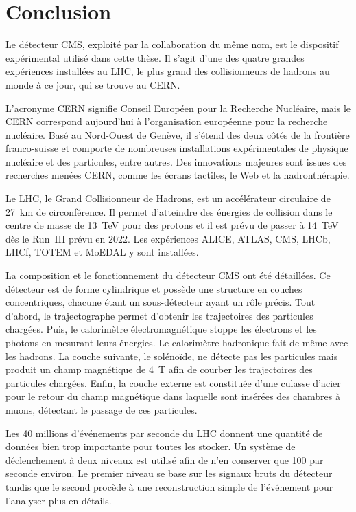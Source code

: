 \section{Conclusion}\label{chapter-LHC-section-conclusion}
Le détecteur CMS, exploité par la collaboration du même nom, est le dispositif expérimental utilisé dans cette thèse.
Il s'agit d'une des quatre grandes expériences installées au LHC, le plus grand des collisionneurs de hadrons au monde à ce jour, qui se trouve au CERN.
\par L'acronyme \og CERN \fg{} signifie Conseil Européen pour la Recherche Nucléaire, mais le CERN correspond aujourd'hui à l'organisation européenne pour la recherche nucléaire.
Basé au Nord-Ouest de Genève, il s'étend des deux côtés de la frontière franco-suisse et comporte de nombreuses installations expérimentales de physique nucléaire et des particules, entre autres.
Des innovations majeures sont issues des recherches menées CERN, comme les écrans tactiles, le Web et la hadronthérapie.
\par Le LHC, le Grand Collisionneur de Hadrons, est un accélérateur circulaire de \SI{27}{\kilo\meter} de circonférence.
Il permet d'atteindre des énergies de collision dans le centre de masse de \SI{13}{\TeV} pour des protons et il est prévu de passer à \SI{14}{\TeV} dès le Run~III prévu en 2022.
Les expériences ALICE, ATLAS, CMS, LHCb, LHCf, TOTEM et MoEDAL y sont installées.
\par La composition et le fonctionnement du détecteur CMS ont été détaillées.
Ce détecteur est de forme cylindrique et possède une structure en couches concentriques, chacune étant un sous-détecteur ayant un rôle précis.
Tout d'abord, le trajectographe permet d'obtenir les trajectoires des particules chargées.
Puis, le calorimètre électromagnétique stoppe les électrons et les photons en mesurant leurs énergies.
Le calorimètre hadronique fait de même avec les hadrons.
La couche suivante, le solénoïde, ne détecte pas les particules mais produit un champ magnétique de \SI{4}{\tesla} afin de courber les trajectoires des particules chargées.
Enfin, la couche externe est constituée d'une culasse d'acier pour le retour du champ magnétique dans laquelle sont insérées des chambres à muons, détectant le passage de ces particules.
\par Les 40 millions d'événements par seconde du LHC donnent une quantité de données bien trop importante pour toutes les stocker.
Un système de déclenchement à deux niveaux est utilisé afin de n'en conserver que 100 par seconde environ.
Le premier niveau se base sur les signaux bruts du détecteur tandis que le second procède à une reconstruction simple de l'événement pour l'analyser plus en détails.
